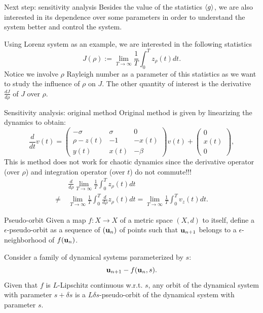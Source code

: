 \documentclass{beamer}
\begin{document}
\begin{frame}{Next step: sensitivity analysis}
	Besides the value of the statistics $\left\langle g \right\rangle$, we are also interested in its dependence 
	over some parameters in order to understand the system better and control the system.

	Using Lorenz system as an example, we are interested in the following statistics
	\begin{equation}
		J(\rho) := \lim_{T\rightarrow \infty} \frac{1}{T}\int_0^T z_{\rho}(t)dt.
	\end{equation}
	Notice we involve $\rho$ Rayleigh number as a parameter of this statistics as we want to study
	the influence of $\rho$ on $J$. The other quantity of interest is the derivative $\frac{dJ}{d\rho}$ of $J$ over
	$\rho$.
\end{frame}

\begin{frame}{Sensitivity analysis: original method}
	Original method is given by linearizing the dynamics to obtain:
	\begin{equation}
		\frac{d}{dt}v(t) = \begin{pmatrix}
			-\sigma & \sigma & 0 \\
			\rho - z(t) & -1 & -x(t) 	 \\
			y(t) & x(t) & -\beta
		\end{pmatrix}v(t) + \begin{pmatrix}
			0 \\ x(t) \\ 0
		\end{pmatrix},
	\end{equation}
	{\color{red}This is method does not work for chaotic dynamics since the derivative operator (over $\rho$)
	and integration operator (over $t$) do not commute!!!}
	\begin{equation}
		\begin{aligned}
			& \ \frac{d}{d\rho}\lim_{T\rightarrow \infty} \frac{1}{T}\int_0^T z_{\rho}(t)dt 	\\
			\neq & \ \lim_{T\rightarrow \infty} \frac{1}{T}\int_0^T \frac{d}{d\rho}z_{\rho}(t)dt = \lim_{T\rightarrow \infty} \frac{1}{T}\int_0^T v_{z}(t)dt.
		\end{aligned}
	\end{equation}
\end{frame}

\begin{frame}{Pseudo-orbit}
	Given a map $f: X\rightarrow X$ of a metric space $(X, d)$ to itself, define a $\epsilon$-pseudo-orbit as a sequence of
$(\mathbf{u}_{n})$ of points such that $\mathbf{u}_{n+1}$ belongs to a $\epsilon$-neighborhood of $f(\mathbf{u}_n)$.
	\begin{example}
		Consider a family of dynamical systems parameterized by $s$:
		\begin{equation}
			\mathbf{u}_{n+1} - f(\mathbf{u}_n, s).
		\end{equation}
		Given that $f$ is $L$-Lipschitz continuous w.r.t. $s$, any orbit of the dynamical system with 
		parameter $s+\delta s$ is a $L\delta s$-pseudo-orbit of the dynamical system with parameter $s$.
	\end{example}
\end{frame}
\end{document}
